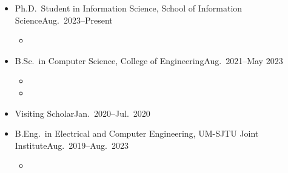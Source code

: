 \documentclass[letterpaper,10.8pt]{article}
\begin{document}
\begin{itemize}
      \item {}
            {Ph.D.\ Student in Information Science, School of Information Science}{Aug.\ 2023--Present}
            \begin{itemize}
                  \item {}
            \end{itemize}

      \item {}
            {B.Sc.\ in Computer Science, College of Engineering}{Aug.\ 2021--May 2023}
            \begin{itemize}
                  \item {}
                  \item {}
            \end{itemize}

      \item {}
            {Visiting Scholar}{Jan.\ 2020--Jul.\ 2020}

      \item {}
            {B.Eng.\ in Electrical and Computer Engineering, UM-SJTU Joint Institute}{Aug.\ 2019--Aug.\ 2023}
            \begin{itemize}
                  \item {}
            \end{itemize}
\end{itemize}

\end{document}
